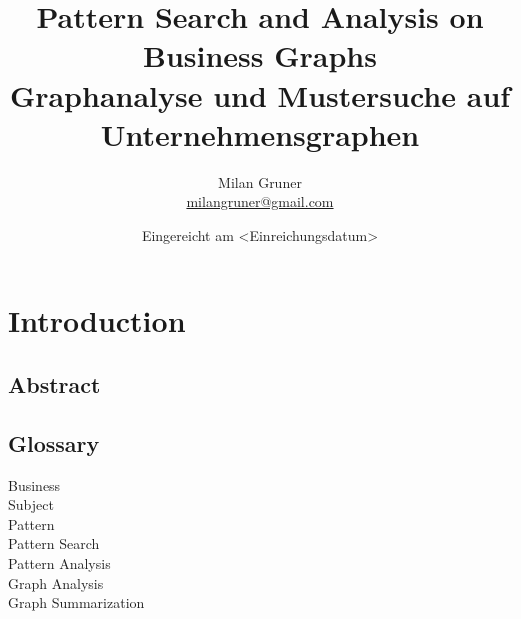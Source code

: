 \documentclass[
        a4paper,     %
        titlepage,   %
        twoside,     %
        parskip      %
        ]{scrartcl} %
\title{Pattern Search and Analysis on Business Graphs
\\ \bigskip 
\large{Graphanalyse und Mustersuche auf Unternehmensgraphen}}
\author{Milan Gruner\\{\small{\url{milangruner@gmail.com}}}}
\date{Eingereicht am <Einreichungsdatum>}
\begin{document}
  \maketitle    %


  \cleardoublepage %

  \section{Introduction}
	\subsection{Abstract}
	
	
	\clearpage	
    \subsection{Glossary}
    Business \\
    Subject \\
    Pattern \\
    Pattern Search \\
    Pattern Analysis \\
    Graph Analysis \\
    Graph Summarization \\

    \clearpage %
    
\end{document}
